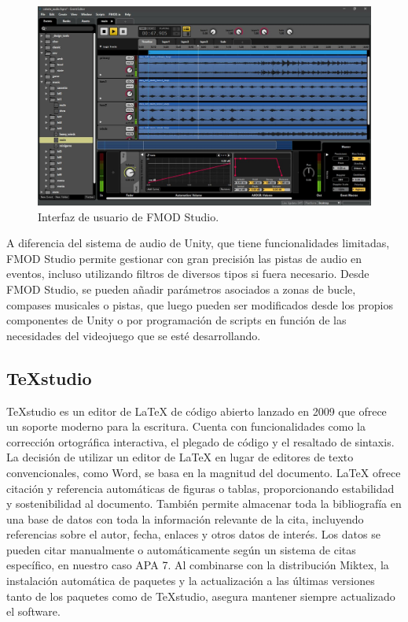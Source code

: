 \begin{figure}[h!]
	\centering
	\includegraphics[width=0.6\linewidth]{./Figuras/Aspectos/FMODStudio.jpg}
	\caption{Interfaz de usuario de FMOD Studio.}
	\label{fig:FMODUI}
\end{figure}

A diferencia del sistema de audio de Unity, que tiene funcionalidades limitadas, FMOD Studio permite gestionar con gran precisión las pistas de audio en eventos, incluso utilizando filtros de diversos tipos si fuera necesario. Desde FMOD Studio, se pueden añadir parámetros asociados a zonas de bucle, compases musicales o pistas, que luego pueden ser modificados desde los propios componentes de Unity o por programación de scripts en función de las necesidades del videojuego que se esté desarrollando.

\subsection{TeXstudio}

TeXstudio es un editor de LaTeX de código abierto lanzado en 2009 que ofrece un soporte moderno para la escritura. Cuenta con funcionalidades como la corrección ortográfica interactiva, el plegado de código y el resaltado de sintaxis. La decisión de utilizar un editor de LaTeX en lugar de editores de texto convencionales, como Word, se basa en la magnitud del documento. LaTeX ofrece citación y referencia automáticas de figuras o tablas, proporcionando estabilidad y sostenibilidad al documento. También permite almacenar toda la bibliografía en una base de datos con toda la información relevante de la cita, incluyendo referencias sobre el autor, fecha, enlaces y otros datos de interés. Los datos se pueden citar manualmente o automáticamente según un sistema de citas específico, en nuestro caso APA 7. Al combinarse con la distribución Miktex, la instalación automática de paquetes y la actualización a las últimas versiones tanto de los paquetes como de TeXstudio, asegura mantener siempre actualizado el software.

